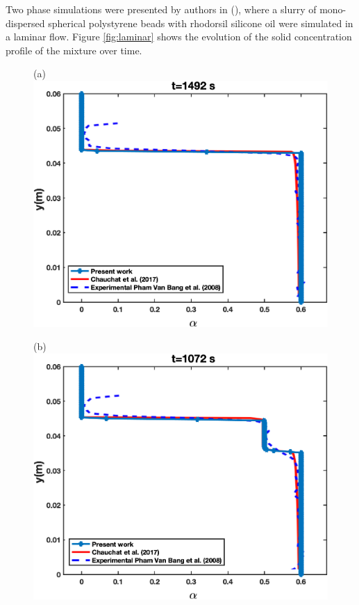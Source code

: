 \documentclass[11pt]{report}
\begin{document}
 \begin{center}
 \end{center}
 Two phase simulations were presented by authors in (\citet{elkarii2020towards}), where a slurry of mono-dispersed spherical polystyrene beads with rhodorsil silicone oil were simulated in a laminar flow. 
 Figure \ref{fig:laminar} shows the evolution of the solid concentration profile of the mixture over time.\\
\begin{figure}[ht!]
 \begin{center}
 (a)\includegraphics[scale = 0.45]{figs/E4}
 \end{center}
 \end{figure}
%
 \begin{figure}[ht!]
 \begin{center}
 (b)\includegraphics[scale = 0.45]{figs/E3}
 \end{center}
 \end{figure}
\end{document}
